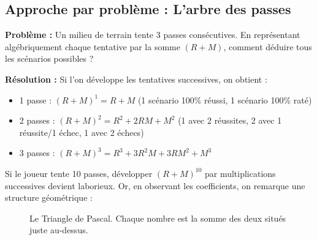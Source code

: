 \documentclass[12pt,a4paper]{report}
\begin{document}
\subsection{Approche par problème : L'arbre des passes}
\textbf{Problème :} Un milieu de terrain tente 3 passes consécutives. En représentant algébriquement chaque tentative par la somme $(R + M)$, comment déduire tous les scénarios possibles ?

\textbf{Résolution :} Si l'on développe les tentatives successives, on obtient :
\begin{itemize}
    \item 1 passe : $(R+M)^1 = R + M$ (1 scénario 100\% réussi, 1 scénario 100\% raté)
    \item 2 passes : $(R+M)^2 = R^2 + 2RM + M^2$ (1 avec 2 réussites, 2 avec 1 réussite/1 échec, 1 avec 2 échecs)
    \item 3 passes : $(R+M)^3 = R^3 + 3R^2M + 3RM^2 + M^3$
\end{itemize}

Si le joueur tente 10 passes, développer $(R+M)^{10}$ par multiplications successives devient laborieux. Or, en observant les coefficients, on remarque une structure géométrique :

\begin{figure}[h!]
    \centering
    \caption{Le Triangle de Pascal. Chaque nombre est la somme des deux situés juste au-dessus.}
    \label{fig:triangle_pascal}
\end{figure}
\end{document}
